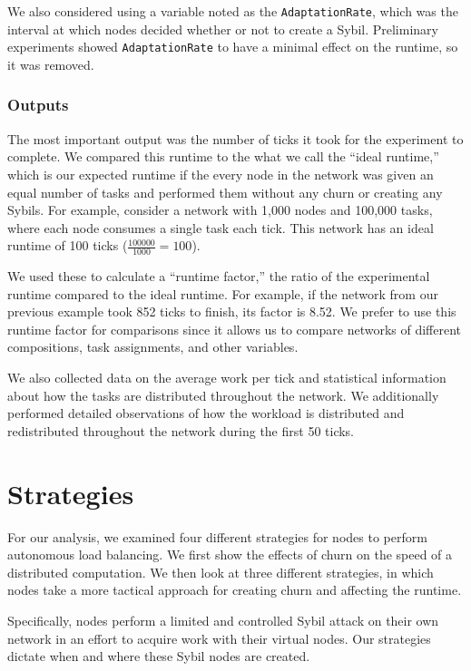 \documentclass[11pt,letterpaper]{article}
\begin{document}
We also considered using a variable noted as the \texttt{AdaptationRate}, which was the interval at which nodes decided whether or not to create a Sybil.
Preliminary experiments showed \texttt{AdaptationRate} to have a minimal effect on the runtime, so it was removed.

\subsubsection{Outputs}
The most important output was the number of ticks it took for the experiment to complete.
We compared this runtime to the what we call the ``ideal runtime,'' which is our expected runtime if the every node in the network was given an equal number of tasks and performed them without any churn or creating any Sybils.
For example, consider a network with 1,000 nodes and 100,000 tasks, where each node consumes a single task each tick. 
This network has an ideal runtime of 100 ticks ($ \frac{100000}{1000} = 100$).

We used these to calculate a ``runtime factor,'' the ratio of the experimental runtime compared to the ideal runtime.
For example, if the network from our previous example took 852 ticks to finish, its factor is 8.52.
We prefer to use this runtime factor for comparisons since it allows us to compare networks of different compositions, task assignments, and other variables.

We also collected data on the average work per tick and statistical information about how the tasks are distributed throughout the network.
We additionally performed detailed observations of how the workload is  distributed and redistributed throughout the network during the first 50 ticks.

\section{Strategies}
\label{sec:strategies}

For our analysis, we examined four different strategies for nodes to perform autonomous load balancing.
We first show the effects of churn on the speed of a distributed computation.
We then look at three different strategies, in which nodes take a more tactical approach for creating churn and affecting the runtime.

Specifically, nodes perform a limited and controlled Sybil attack \cite{sybil} on their own network in an effort to acquire work with their virtual nodes.
Our strategies dictate when and where these Sybil nodes are created.
\end{document}
